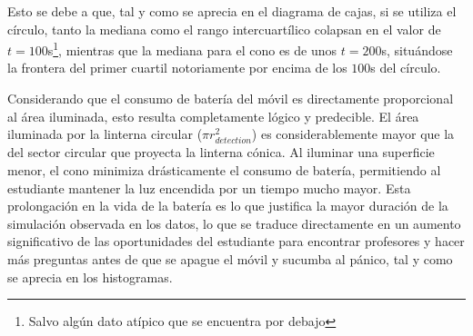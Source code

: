 \documentclass[a4paper, 9pt]{extarticle}
\begin{document}
Esto se debe a que, tal y como se aprecia en el diagrama de cajas, si se utiliza el círculo,
tanto la mediana como el rango intercuartílico colapsan en el valor de $t=100$s\footnote{Salvo algún 
dato atípico que se encuentra por debajo}, mientras que la mediana para el cono es de unos $t=200$s,
situándose la frontera del primer cuartil notoriamente por encima de los $100$s del círculo.

Considerando que el consumo de batería del móvil es directamente proporcional al área iluminada, 
esto resulta completamente lógico y predecible. El área iluminada por la linterna circular ($\pi r_{detection}^2$) 
es considerablemente mayor que la del sector circular que proyecta la linterna cónica. 
Al iluminar una superficie menor, el cono minimiza drásticamente el consumo de batería, permitiendo al estudiante 
mantener la luz encendida por un tiempo mucho mayor. 
Esta prolongación en la vida de la batería es lo que justifica la mayor duración de la simulación 
observada en los datos, lo que se traduce directamente en un aumento significativo de las oportunidades 
del estudiante para encontrar profesores y hacer más preguntas antes de que se apague el móvil y sucumba al pánico, 
tal y como se aprecia en los histogramas.
\end{document}
